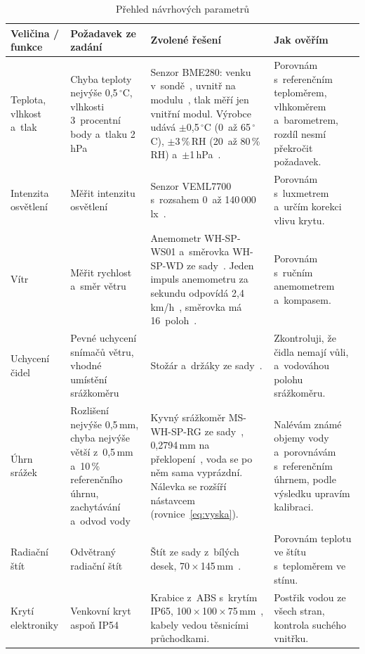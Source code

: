 \begin{table}[!t]
\caption{Přehled návrhových parametrů}
\label{tab:parametry}
{\linespread{1.1}\scriptsize\setlength{\tabcolsep}{3.5pt}\renewcommand{\arraystretch}{1.2}
\begin{tabularx}{\textwidth}{|Z{0.62}|Z{0.78}|Z{1.5}|Z{1.1}|}
\hline
\textbf{Veličina / funkce} & \textbf{Požadavek ze zadání} & \textbf{Zvolené řešení} & \textbf{Jak ověřím} \\
\hline
Teplota, vlhkost a~tlak & Chyba teploty nejvýše 0,5\,$^\circ$C, vlhkosti 3~procentní body a~tlaku 2\,hPa & Senzor BME280: venku v~sondě~\cite{bmesonda}, uvnitř na modulu~\cite{bmemodul}, tlak měří jen vnitřní modul. Výrobce udává $\pm$0,5\,$^\circ$C (0~až 65\,$^\circ$C), $\pm$3\,\%\,RH (20~až 80\,\%\,RH) a~$\pm$1\,hPa~\cite{bme280}. & Porovnám s~referenčním teploměrem, vlhkoměrem a~barometrem, rozdíl nesmí překročit požadavek. \\
\hline
Intenzita osvětlení & Měřit intenzitu osvětlení & Senzor VEML7700 s~rozsahem 0~až 140\,000\,lx~\cite{veml7700}. & Porovnám s~luxmetrem a~určím korekci vlivu krytu. \\
\hline
Vítr & Měřit rychlost a~směr větru & Anemometr WH-SP-WS01 a~směrovka WH-SP-WD ze sady~\cite{sadacidel}. Jeden impuls anemometru za sekundu odpovídá 2,4\,km/h~\cite{macek}, směrovka má 16~poloh~\cite{sparkfun,macek}. & Porovnám s~ručním anemometrem a~kompasem. \\
\hline
Uchycení čidel & Pevné uchycení snímačů větru, vhodné umístění srážkoměru & Stožár a~držáky ze sady~\cite{sadacidel}. & Zkontroluji, že čidla nemají vůli, a~vodováhou polohu srážkoměru. \\
\hline
Úhrn srážek & Rozlišení nejvýše 0,5\,mm, chyba nejvýše větší z~0,5\,mm a~10\,\% referenčního úhrnu, zachytávání a~odvod vody & Kyvný srážkoměr MS-WH-SP-RG ze sady~\cite{sadacidel}, 0,2794\,mm na překlopení~\cite{srazkomerrg}, voda se po něm sama vyprázdní. Nálevka se rozšíří nástavcem (rovnice~\ref{eq:vyska}). & Nalévám známé objemy vody a~porovnávám s~referenčním úhrnem, podle výsledku upravím kalibraci. \\
\hline
Radiační štít & Odvětraný radiační štít & Štít ze sady z~bílých desek, 70\,$\times$\,145\,mm~\cite{sadacidel}. & Porovnám teplotu ve štítu s~teploměrem ve stínu. \\
\hline
Krytí elektroniky & Venkovní kryt aspoň IP54 & Krabice z~ABS s~krytím IP65, 100\,$\times$\,100\,$\times$\,75\,mm~\cite{krabice}, kabely vedou těsnicími průchodkami. & Postřik vodou ze všech stran, kontrola suchého vnitřku. \\

\end{tabularx}}
\end{table}
